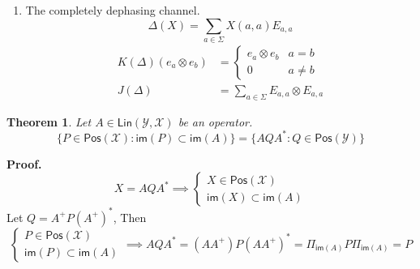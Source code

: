 \documentclass[aps,pra,onecolumn,notitlepage,superscriptaddress]{revtex4-1}
\newcommand{\spc}[1]{\mathcal{#1}}
\newcommand{\Lin}{\mathsf{Lin}}
\newcommand{\Pos}{\mathsf{Pos}}
\newcommand{\im}{\mathsf{im}}
\newtheorem{theo}{Theorem}
\def\Proof{{\bf Proof.~}}
\begin{document}
\begin{enumerate}
        \item The completely dephasing channel.
        \begin{equation}
            \Delta(X) = \sum_{a \in \Sigma} X(a,a) E_{a,a}
        \end{equation}
        \begin{align*}
            K(\Delta)(e_a \otimes e_b) &= 
            \begin{cases}
                e_a \otimes e_b & a = b \\
                0 & a \neq b
            \end{cases} \\
            J(\Delta) &= \sum_{a \in \Sigma} E_{a,a} \otimes E_{a,a}
        \end{align*}
    \end{enumerate}

    \begin{theo}
        Let $A \in \Lin(\spc Y, \spc X)$ be an operator. 
        \begin{equation}
            \{ P \in \Pos(\spc X) : \im(P) \subset \im(A) \}
            =
            \{ AQA^* : Q \in \Pos(\spc Y) \}
        \end{equation}
    \end{theo}
    \Proof {
        \begin{equation}
            X = AQA^* \implies \begin{cases}
                X \in \Pos(\spc X) \\
                \im(X) \subset \im(A)
            \end{cases}
        \end{equation}
        Let $Q = A^+P(A^+)^*$, Then
        \begin{equation}
            \begin{cases}
                P \in \Pos(\spc X) \\
                \im(P) \subset \im(A)
            \end{cases}
            \implies
            AQA^* = (AA^+)P(AA^+)^* = \Pi_{\im(A)}P\Pi_{\im(A)} = P
        \end{equation}
    }
\end{document}
